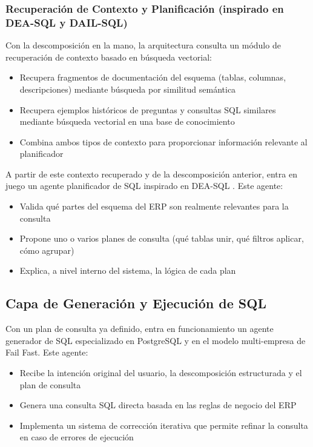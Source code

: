 \documentclass[journal]{IEEEtran}
\begin{document}
\subsubsection{Recuperación de Contexto y Planificación (inspirado en DEA-SQL y DAIL-SQL)}

Con la descomposición en la mano, la arquitectura consulta un módulo de recuperación de contexto basado en búsqueda vectorial:
\begin{itemize}
	\item Recupera fragmentos de documentación del esquema (tablas, columnas, descripciones) mediante búsqueda por similitud semántica
	\item Recupera ejemplos históricos de preguntas y consultas SQL similares mediante búsqueda vectorial en una base de conocimiento
	\item Combina ambos tipos de contexto para proporcionar información relevante al planificador
\end{itemize}

A partir de este contexto recuperado y de la descomposición anterior, entra en juego un agente planificador de SQL inspirado en DEA-SQL \cite{xie2024dea}. Este agente:
\begin{itemize}
	\item Valida qué partes del esquema del ERP son realmente relevantes para la consulta
	\item Propone uno o varios planes de consulta (qué tablas unir, qué filtros aplicar, cómo agrupar)
	\item Explica, a nivel interno del sistema, la lógica de cada plan
\end{itemize}

\subsection{Capa de Generación y Ejecución de SQL}

Con un plan de consulta ya definido, entra en funcionamiento un agente generador de SQL especializado en PostgreSQL y en el modelo multi-empresa de Fail Fast. Este agente:

\begin{itemize}
	\item Recibe la intención original del usuario, la descomposición estructurada y el plan de consulta
	\item Genera una consulta SQL directa basada en las reglas de negocio del ERP
	\item Implementa un sistema de corrección iterativa que permite refinar la consulta en caso de errores de ejecución
\end{itemize}
\end{document}

